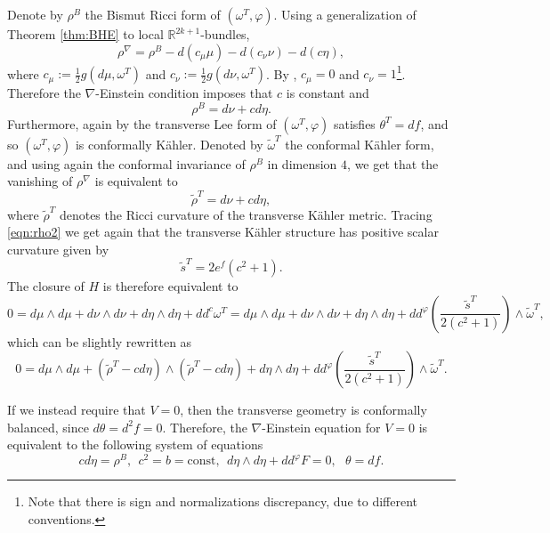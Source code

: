 \documentclass{article}
\makeatletter
\renewenvironment{proof}[1][\proofname]{%
  \par\pushQED{\qed}%
  \normalfont\topsep6\p@\@plus6\p@\relax
  \trivlist
  \item[\hskip\labelsep
        \textbf{\textup{#1}}\@addpunct{.}]\ignorespaces
}{%
  \popQED\endtrivlist\@endpefalse
}
\theoremstyle{definition}
\newcommand{\R}{\mathbb{R}}
\renewcommand{\phi}{\varphi}
\numberwithin{equation}{section}
\makeatother
\begin{document}
\begin{proof}
Denote by $\rho^B$ the Bismut Ricci form of $(\omega^{T}, \phi)$. Using a generalization of Theorem \ref{thm:BHE} to local $\R^{2k+1}$-bundles,
\[
\rho^\nabla=\rho^B-d(c_\mu \mu)-d(c_\nu \nu)-d(c \eta),
\]
where $c_\mu:= \frac{1}{2} g(d\mu, \omega^T)$ and $c_\nu:= \frac{1}{2} g(d\nu, \omega^T)$. By \cite[Theorem 5.6]{KS}, $c_\mu=0$ and $c_\nu=1$\footnote{Note that there is sign and normalizations discrepancy, due to different conventions.}. Therefore the $\nabla$-Einstein condition imposes that $c$ is constant and
\[
\rho^B=d \nu +c d\eta.
\]
Furthermore, again by \cite[Theorem 5.6]{KS} the transverse Lee form of $(\omega^{T}, \phi)$ satisfies $\theta^T=df$, and so $(\omega^{T}, \phi)$ is conformally K\"ahler. Denoted by $\tilde \omega^T$ the conformal K\"ahler form,  and using again the conformal invariance of $\rho^B$ in dimension $4$, we get that the vanishing of $\rho^\nabla$ is equivalent to
\begin{equation} \label{eqn:rho2}
    \tilde \rho^{T}=d \nu +c d\eta,
\end{equation}
where $\tilde \rho^{T}$ denotes the Ricci curvature of the transverse K\"ahler metric. Tracing \eqref{eqn:rho2} we get again that the transverse K\"ahler structure has positive scalar curvature given by
\[
\tilde s^T=2e^f(c^2+1).
\]
The closure of $H$ is therefore equivalent to 
\[
0=d\mu \wedge d\mu+ d\nu \wedge d\nu+d\eta \wedge d\eta+dd^c \omega^T=d\mu \wedge d\mu+ d\nu \wedge d\nu+d\eta \wedge d\eta+dd^\phi \left(\frac{\tilde s^T}{2(c^2+1)}\right)\wedge \tilde \omega^T,
\]
which can be slightly rewritten as 
\begin{equation} \label{eqn:dim7}
    0=d\mu \wedge d\mu+ (\tilde \rho^T -c d\eta) \wedge (\tilde \rho^T -c d\eta)+d\eta \wedge d\eta+dd^\phi \left(\frac{\tilde s^T}{2(c^2+1)}\right)\wedge \tilde \omega^T.
\end{equation}


\medskip

If we instead require that $V=0$, then the transverse geometry is conformally balanced, since $d\theta=d^2f=0$. Therefore, the $\nabla$-Einstein equation for $V=0$ is equivalent to the following system of equations
\begin{equation} \label{eqn:7dim}
    c d\eta=\rho^B, \ \ c^2=b=\text{const}, \ \ d\eta \wedge d\eta + dd^\phi F=0, \ \ \ \theta=df. 
\end{equation}


\end{proof}
\end{document}
